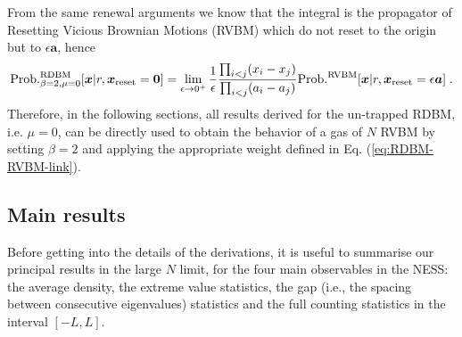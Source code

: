 \documentclass[onecolumn,superscriptaddress,
 amsmath,amssymb,
 aps,
 prd,
]{revtex4-1}
\begin{document}
{\begin{equation}
\end{equation}
From the same renewal arguments we know that the integral is the propagator of Resetting Vicious Brownian Motions (RVBM) which do not reset to the origin but to $\epsilon \bm{a}$, hence
\begin{equation} \label{eq:RDBM-RVBM-link}
{\rm Prob.}^{\rm RDBM}_{\beta = 2,\mu=0}[\bm{x} | r, \bm{x}_{\rm reset} = \bm{0}] = \lim_{\epsilon \to 0^+} \frac{1}{\epsilon} \frac{\prod_{i < j} (x_i - x_j)}{ \prod_{i < j} (a_i - a_j) } {\rm Prob.}^{\rm RVBM}[\bm{x} | r, \bm{x}_{\rm reset} = \epsilon \bm{a}] \;.
\end{equation}
Therefore, in the following sections, all results derived for the un-trapped RDBM, i.e. $\mu = 0$, can be directly used to obtain the behavior of a gas of $N$ RVBM by setting $\beta = 2$ and applying the appropriate weight defined in Eq. (\ref{eq:RDBM-RVBM-link}).

   
   



\subsection{Main results} \label{sec:intro-main-results}

Before getting into the details of the derivations, it is useful to summarise our principal results in the large $N$ limit, for the four main observables in the NESS: the average density, the extreme value statistics, the gap (i.e., the spacing between consecutive eigenvalues) statistics and the full counting statistics in the interval $[-L,L]$.  





}
\end{document}
